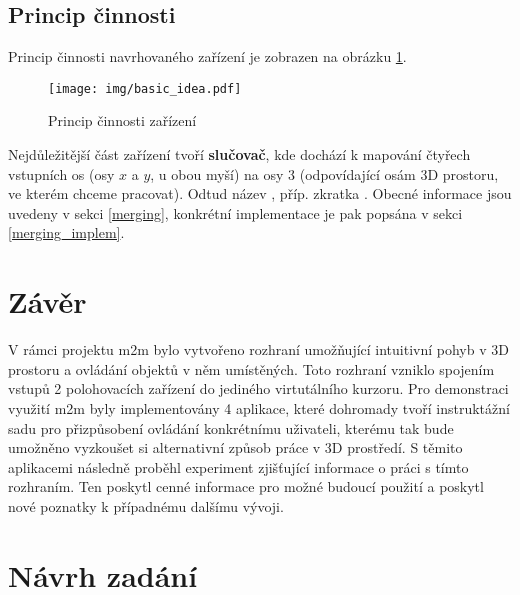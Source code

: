 \documentclass[a4paper,12pt,titlepage]{article}
\begin{document}
\subsection{Princip činnosti}

Princip činnosti navrhovaného zařízení je zobrazen na obrázku \ref{fig:basicidea}.

\begin{figure}[htb]
\centering
\texttt{[image: img/basic\_idea.pdf]}
\caption{Princip činnosti zařízení}
\label{fig:basicidea}
\end{figure}

Nejdůležitější část zařízení tvoří {\bf slučovač}, kde dochází k mapování
čtyřech vstupních os (osy $x$ a $y$, u obou myší) na osy 3 (odpovídající
osám 3D prostoru, ve kterém chceme pracovat). Odtud název , příp.
zkratka .
Obecné informace jsou uvedeny v sekci \ref{merging}, konkrétní implementace
je pak popsána v sekci \ref{merging_implem}.


\clearpage





\section{Závěr}\label{conclusion}
V rámci projektu m2m bylo vytvořeno rozhraní umožňující intuitivní pohyb v 3D prostoru a ovládání objektů v něm umístěných. Toto rozhraní vzniklo spojením vstupů 2 polohovacích zařízení do jediného virtutálního kurzoru. Pro demonstraci využití m2m byly implementovány 4 aplikace, které dohromady tvoří instruktážní sadu pro přizpůsobení ovládání konkrétnímu uživateli, kterému tak bude umožněno vyzkoušet si alternativní způsob práce v 3D prostředí. S těmito aplikacemi následně proběhl experiment zjišťující informace o práci s tímto rozhraním. Ten poskytl cenné informace pro možné budoucí použití a poskytl nové poznatky k případnému dalšímu vývoji.

\newpage

\appendix

\section{Návrh zadání}\label{zadani}
\end{document}
